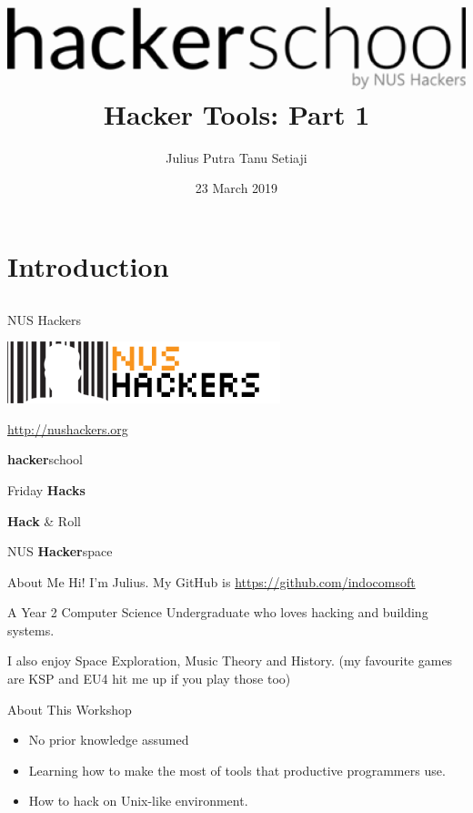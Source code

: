 \documentclass[12pt]{beamer}
\title{\includegraphics[width=0.5\linewidth]{hackerschool} \\ Hacker Tools: Part 1}
\author{Julius Putra Tanu Setiaji}
\date{23 March 2019}
\begin{document}
\frame[plain]{\titlepage}

\section{Introduction}
\subsection{}

\begin{frame}{NUS Hackers}

  \begin{center}
    \includegraphics[width=0.5\linewidth]{NUSHackers}

    \url{http://nushackers.org}
  \end{center}

  \begin{center}
    \textbf{hacker}school

    Friday \textbf{Hacks}

    \textbf{Hack} \& Roll

    NUS \textbf{Hacker}space
  \end{center}

\end{frame}

\begin{frame}{About Me}
  Hi! I'm Julius. My GitHub is \url{https://github.com/indocomsoft}

  A Year 2 Computer Science Undergraduate who loves hacking and building systems.

  I also enjoy Space Exploration, Music Theory and History. {\tiny (my favourite games are KSP and EU4 hit me up if you play those too)}
\end{frame}

\begin{frame}{About This Workshop}
  \begin{itemize}
    \item No prior knowledge assumed
    \item Learning how to make the most of tools that productive programmers use.
    \item How to hack on Unix-like environment.
  \end{itemize}
\end{frame}
\end{document}
